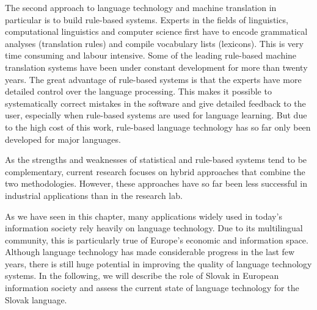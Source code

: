 \begin{multicols}{2}
The second approach to language technology and machine translation in particular is to build rule-based systems. Experts in the fields of linguistics, computational linguistics and computer science first have to encode grammatical analyses (translation rules) and compile vocabulary lists (lexicons). This is very time consuming and labour intensive. Some of the leading rule-based machine translation systems have been under constant development for more than twenty years. The great advantage of rule-based systems is that the experts have more detailed control over the language processing. This makes it possible to systematically correct mistakes in the software and give detailed feedback to the user, especially when rule-based systems are used for language learning. But due to the high cost of this work, rule-based language technology has so far only been developed for major languages. 

As the strengths and weaknesses of statistical and rule-based systems tend to be complementary, current research focuses on hybrid approaches that combine the two methodologies. However, these approaches have so far been less successful in industrial applications than in the research lab. 

As we have seen in this chapter, many applications widely used in today’s information society rely heavily on language technology. Due to its multilingual community, this is particularly true of Europe’s economic and information space. Although language technology has made considerable progress in the last few years, there is still huge potential in improving the quality of language technology systems. In the following, we will describe the role of Slovak in European information society and assess the current state of language technology for the Slovak language. 

\end{multicols}

\clearpage

